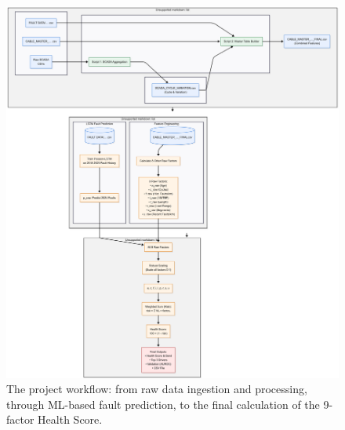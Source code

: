 \documentclass[a4paper,11pt]{article}
\begin{document}
\begin{figure}[h!]
    \centering
    \includegraphics[width=1.1\linewidth, height = 1.5\linewidth, keepaspectratio]{fffff.png}
    \caption{The project workflow: from raw data ingestion and processing, through ML-based fault prediction, to the final calculation of the 9-factor Health Score.}
\end{figure}
\end{document}
